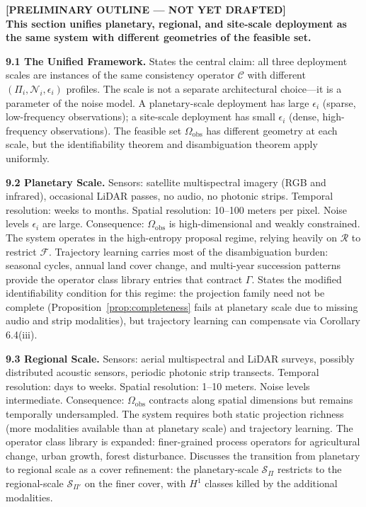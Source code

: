 \documentclass[12pt, oneside]{article}
\newcommand{\preliminary}[1]{%
  \colorbox{yellow!20}{\parbox{\dimexpr\linewidth-2\fboxsep}{%
    \textbf{\textcolor{red!70!black}{[PRELIMINARY OUTLINE --- NOT YET DRAFTED]}}\\[4pt]
    #1
  }}%
}
\begin{document}
\preliminary{
\textbf{This section unifies planetary, regional, and site-scale deployment as the same
system with different geometries of the feasible set.}

\medskip
\textbf{9.1 The Unified Framework.}
States the central claim: all three deployment scales are instances of the same
consistency operator $\mathcal{C}$ with different $(\Pi_i, \mathcal{N}_i, \epsilon_i)$
profiles. The scale is not a separate architectural choice---it is a parameter of the
noise model. A planetary-scale deployment has large $\epsilon_i$ (sparse, low-frequency
observations); a site-scale deployment has small $\epsilon_i$ (dense, high-frequency
observations). The feasible set $\Omega_{\mathrm{obs}}$ has different geometry at each
scale, but the identifiability theorem and disambiguation theorem apply uniformly.

\medskip
\textbf{9.2 Planetary Scale.}
Sensors: satellite multispectral imagery (RGB and infrared), occasional LiDAR passes,
no audio, no photonic strips. Temporal resolution: weeks to months. Spatial resolution:
10--100 meters per pixel. Noise levels $\epsilon_i$ are large. Consequence: $\Omega_{\mathrm{obs}}$
is high-dimensional and weakly constrained. The system operates in the high-entropy
proposal regime, relying heavily on $\mathcal{R}$ to restrict $\mathcal{F}$. Trajectory
learning carries most of the disambiguation burden: seasonal cycles, annual land cover
change, and multi-year succession patterns provide the operator class library entries that
contract $\Gamma$. States the modified identifiability condition for this regime: the
projection family need not be complete (Proposition~\ref{prop:completeness} fails at
planetary scale due to missing audio and strip modalities), but trajectory learning can
compensate via Corollary 6.4(iii).

\medskip
\textbf{9.3 Regional Scale.}
Sensors: aerial multispectral and LiDAR surveys, possibly distributed acoustic sensors,
periodic photonic strip transects. Temporal resolution: days to weeks. Spatial resolution:
1--10 meters. Noise levels intermediate. Consequence: $\Omega_{\mathrm{obs}}$ contracts
along spatial dimensions but remains temporally undersampled. The system requires both
static projection richness (more modalities available than at planetary scale) and
trajectory learning. The operator class library is expanded: finer-grained process
operators for agricultural change, urban growth, forest disturbance. Discusses the
transition from planetary to regional scale as a cover refinement: the planetary-scale
$\mathcal{S}_\Pi$ restricts to the regional-scale $\mathcal{S}_{\Pi'}$ on the finer
cover, with $H^1$ classes killed by the additional modalities.

}
\end{document}
